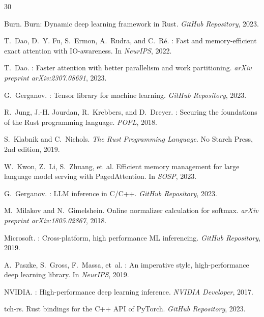 \documentclass[11pt,twocolumn]{article}
\begin{document}

\begin{thebibliography}{30}

Burn.
\newblock Burn: Dynamic deep learning framework in {Rust}.
\newblock \emph{GitHub Repository}, 2023.

T.~Dao, D.~Y. Fu, S.~Ermon, A.~Rudra, and C.~R\'e.
: Fast and memory-efficient exact attention with {IO}-awareness.
\newblock In \emph{NeurIPS}, 2022.

T.~Dao.
: Faster attention with better parallelism and work partitioning.
\newblock \emph{arXiv preprint arXiv:2307.08691}, 2023.

G.~Gerganov.
: Tensor library for machine learning.
\newblock \emph{GitHub Repository}, 2023.

R.~Jung, J.-H. Jourdan, R.~Krebbers, and D.~Dreyer.
: Securing the foundations of the {Rust} programming language.
\newblock \emph{POPL}, 2018.

S.~Klabnik and C.~Nichols.
\newblock \emph{The Rust Programming Language}.
\newblock No Starch Press, 2nd edition, 2019.

W.~Kwon, Z.~Li, S.~Zhuang, et~al.
\newblock Efficient memory management for large language model serving with {PagedAttention}.
\newblock In \emph{SOSP}, 2023.

G.~Gerganov.
: LLM inference in {C/C++}.
\newblock \emph{GitHub Repository}, 2023.

M.~Milakov and N.~Gimelshein.
\newblock Online normalizer calculation for softmax.
\newblock \emph{arXiv preprint arXiv:1805.02867}, 2018.

Microsoft.
: Cross-platform, high performance {ML} inferencing.
\newblock \emph{GitHub Repository}, 2019.

A.~Paszke, S.~Gross, F.~Massa, et~al.
: An imperative style, high-performance deep learning library.
\newblock In \emph{NeurIPS}, 2019.

NVIDIA.
: High-performance deep learning inference.
\newblock \emph{NVIDIA Developer}, 2017.

tch-rs.
\newblock Rust bindings for the {C++} {API} of {PyTorch}.
\newblock \emph{GitHub Repository}, 2023.


\end{thebibliography}
\end{document}
